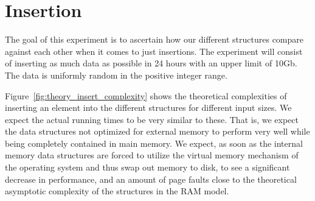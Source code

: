 \documentclass[twoside,11pt,openright]{report}
\begin{document}
\clearpage

\section{Insertion}
\label{src:insertion}
The goal of this experiment is to ascertain how our different structures compare against each other when it comes to just insertions. The experiment will consist of inserting as much data as possible in 24 hours with an upper limit of 10Gb. The data is uniformly random in the positive integer range.

Figure~\ref{fig:theory_insert_complexity} shows the theoretical complexities of inserting an element into the different structures for different input sizes. We expect the actual running times to be very similar to these. That is, we expect the data structures not optimized for external memory to perform very well while being completely contained in main memory. We expect, as soon as the internal memory data structures are forced to utilize the virtual memory mechanism of the operating system and thus swap out memory to disk, to see a significant decrease in performance, and an amount of page faults close to the theoretical asymptotic complexity of the structures in the RAM model.
\end{document}
